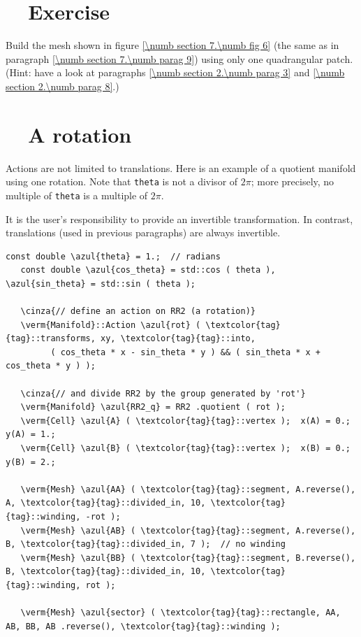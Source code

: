 \section{~~Exercise}\label{\numb section 7.\numb parag 10}

Build the mesh shown in figure \ref{\numb section 7.\numb fig 6}
(the same as in paragraph \ref{\numb section 7.\numb parag 9}) using only one quadrangular patch.
(Hint: have a look at paragraphs \ref{\numb section 2.\numb parag 3} and
\ref{\numb section 2.\numb parag 8}.)


\section{~~A rotation}\label{\numb section 7.\numb parag 11}

Actions are not limited to translations.
Here is an example of a quotient manifold using one rotation.
Note that {\small\tt theta} is not a divisor of $ 2\pi $;
more precisely, no multiple of {\small\tt theta} is a multiple of $ 2\pi $.

It is the user's responsibility to provide an invertible transformation.
In contrast, translations (used in previous paragraphs) are always invertible.

\begin{Verbatim}[commandchars=\\\{\},formatcom=\small\tt,frame=single,
   label=parag-\ref{\numb section 7.\numb parag 11}.cpp,rulecolor=\color{coment},
   baselinestretch=0.94,framesep=2mm                                             ]
   const double \azul{theta} = 1.;  // radians
   const double \azul{cos_theta} = std::cos ( theta ), \azul{sin_theta} = std::sin ( theta );
	
   \cinza{// define an action on RR2 (a rotation)}
   \verm{Manifold}::Action \azul{rot} ( \textcolor{tag}{tag}::transforms, xy, \textcolor{tag}{tag}::into,
         ( cos_theta * x - sin_theta * y ) && ( sin_theta * x + cos_theta * y ) );

   \cinza{// and divide RR2 by the group generated by 'rot'}
   \verm{Manifold} \azul{RR2_q} = RR2 .quotient ( rot );
   \verm{Cell} \azul{A} ( \textcolor{tag}{tag}::vertex );  x(A) = 0.;  y(A) = 1.;
   \verm{Cell} \azul{B} ( \textcolor{tag}{tag}::vertex );  x(B) = 0.;  y(B) = 2.;

   \verm{Mesh} \azul{AA} ( \textcolor{tag}{tag}::segment, A.reverse(), A, \textcolor{tag}{tag}::divided_in, 10, \textcolor{tag}{tag}::winding, -rot );
   \verm{Mesh} \azul{AB} ( \textcolor{tag}{tag}::segment, A.reverse(), B, \textcolor{tag}{tag}::divided_in, 7 );  // no winding
   \verm{Mesh} \azul{BB} ( \textcolor{tag}{tag}::segment, B.reverse(), B, \textcolor{tag}{tag}::divided_in, 10, \textcolor{tag}{tag}::winding, rot );

   \verm{Mesh} \azul{sector} ( \textcolor{tag}{tag}::rectangle, AA, AB, BB, AB .reverse(), \textcolor{tag}{tag}::winding );
\end{Verbatim}

